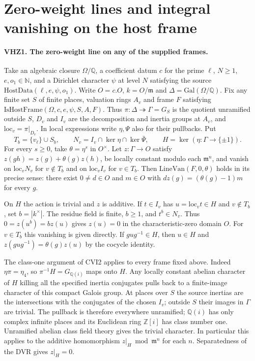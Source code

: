 \section{Zero-weight lines and integral vanishing on the host frame}
\label{sec:host-van-e}

\paragraph{VHZ1. The zero-weight line on any of the supplied frames.}
\label{claim:VHZ1}
Take an algebraic closure $\Omega/\mathbb Q$, a coefficient datum
$c$ for the prime $\ell$, $N\ge1$, $e,o_1\in\mathbb N$, and a
Dirichlet character $\psi$ at level $N$ satisfying the source
$\mathrm{HostData}(\ell,e,\psi,o_1)$. Write $O=c.O$, $k=O/\mathfrak m$
and $\Delta=\mathrm{Gal}(\Omega/\mathbb Q)$. Fix any finite set
$S$ of finite places, valuation rings $A_v$ and frame $F$ satisfying
$\mathrm{IsHostFrame}(\Omega,c,e,\psi,S,A,F)$.
Thus $\pi:\Delta\twoheadrightarrow\Gamma=G_S$ is the quotient
unramified outside $S$, $D_v$ and $I_v$ are the decomposition and
inertia groups at $A_v$, and $\mathrm{loc}_v=\pi|_{D_v}$. In local
expressions write $\eta,\Psi$ also for their pullbacks. Put
\[
 T_b=\{v_\ell\}\cup S_b,\qquad
 N_v=I_v\cap\ker\eta\cap\ker\bar\Psi,\qquad H=\ker(\eta:\Gamma\to\{\pm1\}).
\]
For every $s\ge0$, take $\theta=\eta^s$ in $O^\times$.
Let $z:\Gamma\to O$ satisfy
$z(gh)=z(g)+\theta(g)z(h)$, be locally constant modulo each
$\mathfrak m^n$, and vanish on $\mathrm{loc}_v N_v$ for
$v\notin T_b$ and on $\mathrm{loc}_v I_v$ for $v\in T_b$.
Then $\mathrm{LineVan}(F,0,\theta)$ holds in its precise sense:
there exist $0\ne d\in O$ and $m\in O$ with
$d z(g)=(\theta(g)-1)m$ for every $g$.

On $H$ the action is trivial and $z$ is additive. If $t\in I_v$
has $u=\mathrm{loc}_v t\in H$ and $v\notin T_b$, set
$b=|k^\times|$. The residue field is finite, $b\ge1$, and
$t^b\in N_v$. Thus $0=z(u^b)=b z(u)$ gives $z(u)=0$ in the
characteristic-zero domain $O$. For $v\in T_b$ this vanishing
is given directly. If $gug^{-1}\in H$, then $u\in H$ and
$z(gug^{-1})=\theta(g)z(u)$ by the cocycle identity.

The class-one argument of CVI2 applies to every frame fixed above.
Indeed $\eta\pi=\eta_4$, so $\pi^{-1}H=G_{\mathbb Q(i)}$ maps
onto $H$. Any locally constant abelian character of $H$ killing all
the specified inertia conjugates pulls back to a finite-image character
of this compact Galois group. At places over $S$ the source inertias
are the intersections with the conjugates of the chosen $I_v$;
outside $S$ their images in $\Gamma$ are trivial. The pullback is
therefore everywhere unramified; $\mathbb Q(i)$ has only complex
infinite places and its Euclidean ring $\mathbb Z[i]$ has class number
one. Unramified abelian class field theory gives the trivial character.
In particular this applies to the additive homomorphism
$z|_H\bmod\mathfrak m^n$ for each $n$. Separatedness of the DVR
gives $z|_H=0$.

